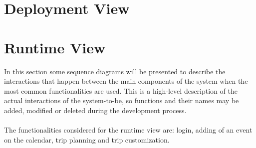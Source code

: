 %
%
\section{Deployment View}
%
%
\section{Runtime View}
In this section some sequence diagrams will be presented to describe the interactions that happen between the main components of the system when the most common functionalities are used. This is a high-level description of the actual interactions of the system-to-be, so functions and their names may be added, modified or deleted during the development process.
\\
\\
The functionalities considered for the runtime view are: login, adding of an event on the calendar, trip planning and trip customization.

\pagebreak
\begin{landscape}
\begin{center}
\thispagestyle{empty}
\end{center}
\end{landscape}

